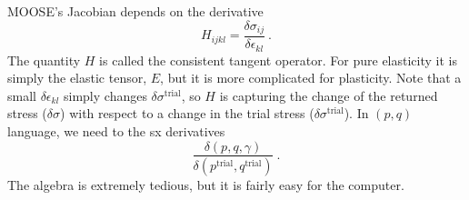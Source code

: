\documentclass[]{scrreprt}
\begin{document}
MOOSE's Jacobian depends on the derivative
\begin{equation}
H_{ijkl} = \frac{\delta\sigma_{ij}}{\delta \epsilon_{kl}} \ .
\end{equation}
The quantity $H$ is called the consistent tangent operator.  For pure
elasticity it is simply the elastic tensor, $E$, but it is more
complicated for plasticity.  Note that a small $\delta\epsilon_{kl}$
simply changes $\delta\sigma^{\mathrm{trial}}$, so $H$ is capturing the
change of the returned stress ($\delta\sigma$) with respect to a
change in the trial stress ($\delta\sigma^{\mathrm{trial}}$).  In
$(p,q)$ language, we need to the sx derivatives
\begin{equation}
\frac{\delta (p, q, \gamma)}{\delta (p^{\mathrm{trial}},
  q^{\mathrm{trial}})} \ .
\end{equation}
The algebra is extremely tedious, but it is fairly easy for the
computer.
\end{document}
